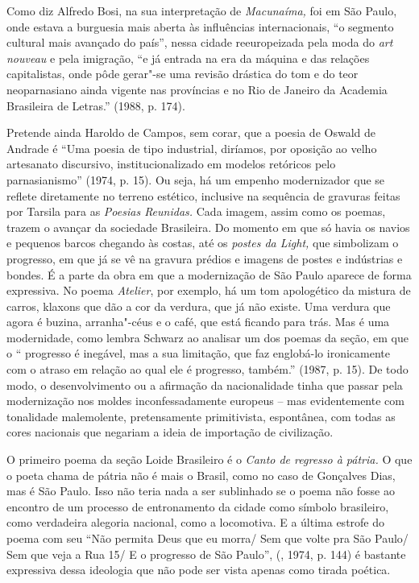 {Como diz Alfredo Bosi, na sua interpretação de \emph{Macunaíma,} foi em
São Paulo, onde estava a burguesia mais aberta às influências
internacionais, ``o segmento cultural mais avançado do país'', nessa
cidade reeuropeizada pela moda do \emph{art nouveau} e pela imigração,
``e já entrada na era da máquina e das relações capitalistas, onde pôde
gerar"-se uma revisão drástica do tom e do teor neoparnasiano ainda
vigente nas províncias e no Rio de Janeiro da Academia Brasileira de
Letras.'' (1988, p. 174).

Pretende ainda Haroldo de Campos, sem corar, que a poesia de Oswald de
Andrade é ``Uma poesia de tipo industrial, diríamos, por oposição ao
velho artesanato discursivo, institucionalizado em modelos retóricos
pelo parnasianismo'' (1974, p. 15). Ou seja, há um empenho modernizador
que se reflete diretamente no terreno estético, inclusive na sequência
de gravuras feitas por Tarsila para as \emph{Poesias Reunidas.} Cada
imagem, assim como os poemas, trazem o avançar da sociedade Brasileira.
Do momento em que só havia os navios e pequenos barcos chegando às
costas, até os \emph{postes da Light,} que simbolizam o progresso, em
que já se vê na gravura prédios e imagens de postes e indústrias e
bondes. É a parte da obra em que a modernização de São Paulo aparece de
forma expressiva. No poema \emph{Atelier}, por exemplo, há um tom
apologético da mistura de carros, klaxons que dão a cor da verdura, que
já não existe. Uma verdura que agora é buzina, arranha"-céus e o café,
que está ficando para trás. Mas é uma modernidade, como lembra Schwarz
ao analisar um dos poemas da seção, em que o `` progresso é inegável,
mas a sua limitação, que faz englobá-lo ironicamente com o atraso em
relação ao qual ele é progresso, também.'' (1987, p. 15). De todo modo,
o desenvolvimento ou a afirmação da nacionalidade tinha que passar pela
modernização nos moldes inconfessadamente europeus -- mas evidentemente
com tonalidade malemolente, pretensamente primitivista, espontânea, com
todas as cores nacionais que negariam a ideia de importação de
civilização.

O primeiro poema da seção Loide Brasileiro é o \emph{Canto de regresso à
pátria.} O que o poeta chama de pátria não é mais o Brasil, como no caso
de Gonçalves Dias, mas é São Paulo. Isso não teria nada a ser sublinhado
se o poema não fosse ao encontro de um processo de entronamento da
cidade como símbolo brasileiro, como verdadeira alegoria nacional, como
a locomotiva. E a última estrofe do poema com seu ``Não permita Deus que
eu morra/ Sem que volte pra São Paulo/ Sem que veja a Rua 15/ E o
progresso de São Paulo'', (, 1974, p. 144) é bastante expressiva
dessa ideologia que não pode ser vista apenas como tirada poética.

}
